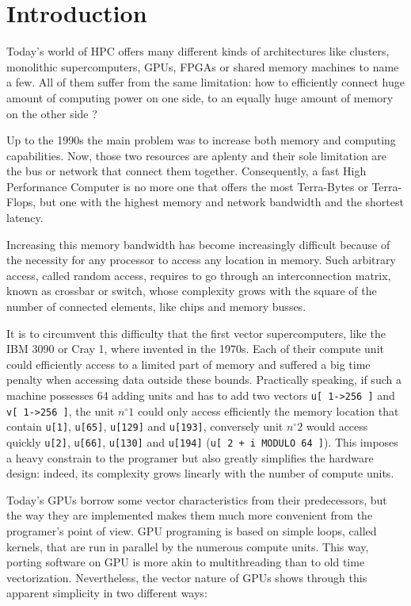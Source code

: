 \documentclass[a4paper,12pt]{article}
\begin{document}
\clearpage


%
%

\section{Introduction}
Today's world of HPC offers many different kinds of architectures like clusters, monolithic supercomputers, GPUs, FPGAs or shared memory machines to name a few. All of them suffer from the same limitation: how to efficiently connect huge amount of computing power on one side, to an equally huge amount of memory on the other side ?

Up to the 1990s the main problem was to increase both memory and computing capabilities. Now, those two resources are aplenty and their sole limitation are the bus or network that connect them together. Consequently, a fast High Performance Computer is no more one that offers the most Terra-Bytes or Terra-Flops, but one with the highest memory and network bandwidth and the shortest latency.

Increasing this memory bandwidth has become increasingly difficult because of the necessity for any processor to access any location in memory. Such arbitrary access, called random access, requires to go through an interconnection matrix, known as crossbar or switch, whose complexity grows with the square of the number of connected elements, like chips and memory busses.

It is to circumvent this difficulty that the first vector supercomputers, like the IBM 3090 or Cray 1, where invented in the 1970s. Each of their compute unit could efficiently access to a limited part of memory and suffered a big time penalty when accessing data outside these bounds. Practically speaking, if such a machine possesses 64 adding units and has to add two vectors {\tt u[ 1->256 ]} and {\tt v[ 1->256 ]}, the unit $n^\circ1$ could only access efficiently the memory location that contain {\tt u[1]}, {\tt u[65]}, {\tt u[129]} and {\tt u[193]}, conversely unit $n^\circ2$ would access quickly {\tt u[2]}, {\tt u[66]}, {\tt u[130]} and {\tt u[194]} ({\tt u[ 2 + i MODULO 64 ]}). This imposes a heavy constrain to the programer but also greatly simplifies the hardware design: indeed, its complexity grows linearly with the number of compute units.

Today's GPUs borrow some vector characteristics from their predecessors, but the way they are implemented makes them much more convenient from the programer's point of view. GPU programing is based on simple loops, called kernels, that are run in parallel by the numerous compute units. This way, porting software on GPU is more akin to multithreading than to old time vectorization. Nevertheless, the vector nature of GPUs shows through this apparent simplicity in two different ways:
\end{document}

